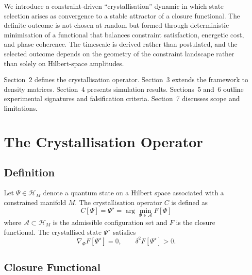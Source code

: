 \documentclass[12pt]{article}
\begin{document}
We introduce a constraint-driven ``crystallisation'' dynamic in which state selection arises as convergence to a stable attractor of a closure functional. The definite outcome is not chosen at random but formed through deterministic minimisation of a functional that balances constraint satisfaction, energetic cost, and phase coherence. The timescale is derived rather than postulated, and the selected outcome depends on the geometry of the constraint landscape rather than solely on Hilbert-space amplitudes.

Section~2 defines the crystallisation operator. Section~3 extends the framework to density matrices. Section~4 presents simulation results. Sections~5 and~6 outline experimental signatures and falsification criteria. Section~7 discusses scope and limitations.

\section{The Crystallisation Operator}

\subsection{Definition}

Let $\Psi \in \mathcal{H}_M$ denote a quantum state on a Hilbert space associated with a constrained manifold $M$. The crystallisation operator $C$ is defined as
\begin{equation}
C[\Psi] = \Psi^{\star} = \arg\min_{\Phi \in \mathcal{A}} F[\Phi]
\end{equation}
where $\mathcal{A} \subset \mathcal{H}_M$ is the admissible configuration set and $F$ is the closure functional. The crystallised state $\Psi^{\star}$ satisfies
\begin{equation}
\nabla_\Phi F[\Psi^{\star}] = 0, \qquad \delta^2 F[\Psi^{\star}] > 0.
\end{equation}

\subsection{Closure Functional}
\end{document}
